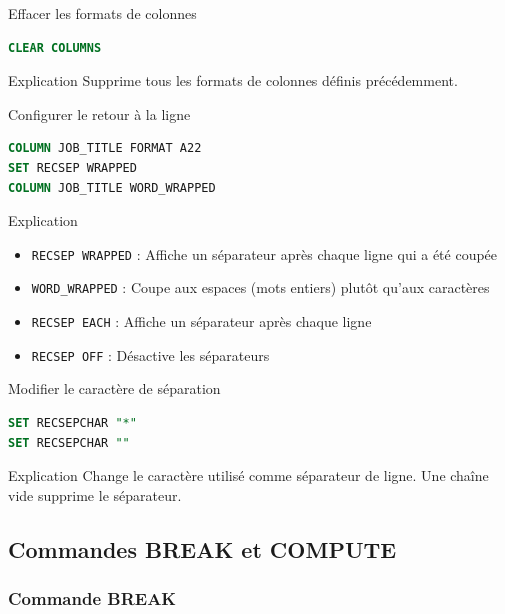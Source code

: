 \documentclass[12pt,a4paper]{article}
\begin{document}
\begin{commande}{Effacer les formats de colonnes}
\begin{lstlisting}[language=SQL]
CLEAR COLUMNS
\end{lstlisting}
\end{commande}

\begin{explication}{Explication}
Supprime tous les formats de colonnes définis précédemment.
\end{explication}

\begin{commande}{Configurer le retour à la ligne}
\begin{lstlisting}[language=SQL]
COLUMN JOB_TITLE FORMAT A22
SET RECSEP WRAPPED
COLUMN JOB_TITLE WORD_WRAPPED
\end{lstlisting}
\end{commande}

\begin{explication}{Explication}
\begin{itemize}
    \item \texttt{RECSEP WRAPPED} : Affiche un séparateur après chaque ligne qui a été coupée
    \item \texttt{WORD\_WRAPPED} : Coupe aux espaces (mots entiers) plutôt qu'aux caractères
    \item \texttt{RECSEP EACH} : Affiche un séparateur après chaque ligne
    \item \texttt{RECSEP OFF} : Désactive les séparateurs
\end{itemize}
\end{explication}

\begin{commande}{Modifier le caractère de séparation}
\begin{lstlisting}[language=SQL]
SET RECSEPCHAR "*"
SET RECSEPCHAR ""
\end{lstlisting}
\end{commande}

\begin{explication}{Explication}
Change le caractère utilisé comme séparateur de ligne. Une chaîne vide supprime le séparateur.
\end{explication}

\subsection{Commandes BREAK et COMPUTE}

\subsubsection{Commande BREAK}
\end{document}

